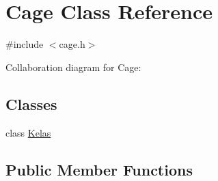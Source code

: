 \hypertarget{classCage}{}\section{Cage Class Reference}
\label{classCage}


{\ttfamily \#include $<$cage.\+h$>$}



Collaboration diagram for Cage\+:
\subsection*{Classes}
\begin{DoxyCompactItemize}
\item 
class \hyperlink{classCage_1_1Kelas}{Kelas}
\end{DoxyCompactItemize}
\subsection*{Public Member Functions}
